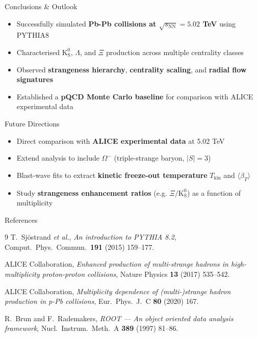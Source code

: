 \documentclass[10pt, aspectratio=169]{beamer}
\begin{document}
\begin{frame}{Conclusions \& Outlook}

  \begin{itemize}
    \item[$\checkmark$] Successfully simulated \textbf{Pb-Pb collisions at $\sqrt{s_\mathrm{NN}} = 5.02$ TeV} using PYTHIA8
    \item[$\checkmark$] Characterised $\mathrm{K^0_S}$, $\Lambda$, and $\Xi$ production across multiple centrality classes
    \item[$\checkmark$] Observed \textbf{strangeness hierarchy}, \textbf{centrality scaling}, and \textbf{radial flow signatures}
    \item[$\checkmark$] Established a \textbf{pQCD Monte Carlo baseline} for comparison with ALICE experimental data
  \end{itemize}

  \vspace{0.5cm}

  \begin{block}{Future Directions}
    \begin{itemize}
      \item Direct comparison with \textbf{ALICE experimental data} at 5.02 TeV
      \item Extend analysis to include $\Omega^-$ (triple-strange baryon, $|S|=3$)
      \item Blast-wave fits to extract \textbf{kinetic freeze-out temperature} $T_\mathrm{kin}$ and $\langle \beta_T \rangle$
      \item Study \textbf{strangeness enhancement ratios} (e.g. $\Xi/\mathrm{K^0_S}$) as a function of multiplicity
    \end{itemize}
  \end{block}

\end{frame}

\begin{frame}{References}

  \begin{thebibliography}{9}
    \small
      T.~Sjöstrand \textit{et al.},
      \textit{An introduction to PYTHIA 8.2},
      Comput.\ Phys.\ Commun.\ \textbf{191} (2015) 159--177.

      ALICE Collaboration,
      \textit{Enhanced production of multi-strange hadrons in high-multiplicity proton-proton collisions},
      Nature Physics \textbf{13} (2017) 535--542.

      ALICE Collaboration,
      \textit{Multiplicity dependence of (multi-)strange hadron production in p-Pb collisions},
      Eur.\ Phys.\ J.\ C \textbf{80} (2020) 167.

      R.~Brun and F.~Rademakers,
      \textit{ROOT — An object oriented data analysis framework},
      Nucl.\ Instrum.\ Meth.\ A \textbf{389} (1997) 81--86.
  \end{thebibliography}

\end{frame}
\end{document}
